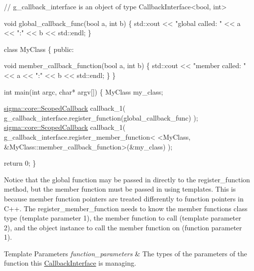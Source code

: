 \begin{DoxyCode}
\textcolor{comment}{// g\_callback\_interface is an object of type CallbackInterface<bool, int>}

\textcolor{keywordtype}{void} global\_callback\_func(\textcolor{keywordtype}{bool} a, \textcolor{keywordtype}{int} b)
\{
    std::cout << \textcolor{stringliteral}{"global called: "} << a << \textcolor{stringliteral}{":"} << b << std::endl;
\}

\textcolor{keyword}{class }MyClass
\{
\textcolor{keyword}{public}:

    \textcolor{keywordtype}{void} member\_callback\_function(\textcolor{keywordtype}{bool} a, \textcolor{keywordtype}{int} b)
    \{
        std::cout << \textcolor{stringliteral}{"member called: "} << a << \textcolor{stringliteral}{":"} << b << std::endl;
    \}
\}

\textcolor{keywordtype}{int} main(\textcolor{keywordtype}{int} argc, \textcolor{keywordtype}{char}* argv[])
\{
    MyClass my\_class;

    \hyperlink{classsigma_1_1core_1_1_scoped_callback}{sigma::core::ScopedCallback} callback\_1(
            g\_callback\_interface.register\_function(global\_callback\_func)
    );
    \hyperlink{classsigma_1_1core_1_1_scoped_callback}{sigma::core::ScopedCallback} callback\_1(
            g\_callback\_interface.register\_member\_function<
                    <MyClass, &MyClass::member\_callback\_function>(&my\_class)
    );

    \textcolor{keywordflow}{return} 0;
\}
\end{DoxyCode}


Notice that the global function may be passed in directly to the {\ttfamily register\-\_\-function method}, but the member function must be passed in using templates. This is because member function pointers are treated differently to function pointers in C++. The {\ttfamily register\-\_\-member\-\_\-function} needs to know the member functions class type (template parameter 1), the member function to call (template parameter 2), and the object instance to call the member function on (function parameter 1).


\begin{DoxyTemplParams}{Template Parameters}
{\em function\-\_\-parameters} & The types of the parameters of the function this \hyperlink{classsigma_1_1core_1_1_callback_interface}{Callback\-Interface} is managing. \\
\hline
\end{DoxyTemplParams}


